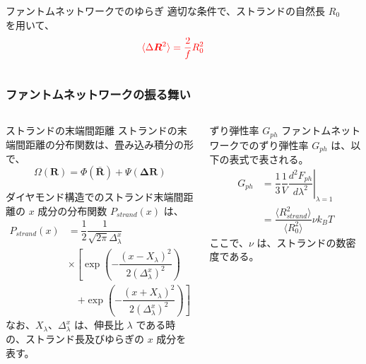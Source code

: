 \documentclass[11pt, dvipdfmx]{beamer}
\begin{document}
\begin{frame}
\begin{columns}[totalwidth=1\textwidth]
\begin{exampleblock}{ファントムネットワークでのゆらぎ}
適切な条件で、ストランドの自然長 $R_0$\\
を用いて、
\vspace{-3mm}
\begin{equation*}
\color{red}
\langle \Delta \bm{R}^2 \rangle = \dfrac{2}{f} R_0^2
\end{equation*}
\vspace{-6mm}
\end{exampleblock}

\end{columns}

\end{frame}


\begin{frame}
\frametitle{ファントムネットワークの振る舞い}

\begin{columns}[totalwidth=1\textwidth]
\scriptsize
\begin{block}{ストランドの末端間距離}
ストランドの末端間距離の分布関数は、畳み込み積分の形で、
\vspace{-3mm}
\begin{equation*}
\Omega(\bm{R}) = \Phi(\bar{\bm{R}}) + \Psi(\bm{\Delta R})
\end{equation*}

ダイヤモンド構造でのストランド末端間距離の $x$ 成分の分布関数 $P_{strand}(x)$ は、\vspace{-3mm}
\begin{align*}
P_{strand}(x) 
&= \dfrac{1}{2}\dfrac{1}{\sqrt{2\pi}\Delta_{\lambda}^x} \\
&\times \left[ \exp\left(-\dfrac{(x-X_{\lambda})^2}{2(\Delta_{\lambda}^x)^2} \right) \right. \\
&\quad \left. + \exp\left(-\dfrac{(x+X_{\lambda})^2}{2(\Delta_{\lambda}^x)^2} \right) \right]
\end{align*}
なお、$X_{\lambda}$、$\Delta_{\lambda}^x$ は、伸長比 $\lambda$ である時の、ストランド長及びゆらぎの $x$ 成分を表す。
\end{block}

\scriptsize
\begin{block}{ずり弾性率 $G_{ph}$}
ファントムネットワークでのずり弾性率 $G_{ph}$ は、以下の表式で表される。
\vspace{-3mm}
\begin{align*}
G_{ph} &= \dfrac{1}{3} \dfrac{1}{V} \left. \dfrac{d^2 F_{ph}}{d \lambda^2} \right|_{\lambda = 1}\\
&=\dfrac{\langle R_{strand}^2 \rangle}{\langle R_0^2 \rangle} \nu k_B T
\end{align*}
ここで、$\nu$ は、ストランドの数密度である。


\end{block}
\end{columns}
\end{frame}
\end{document}
